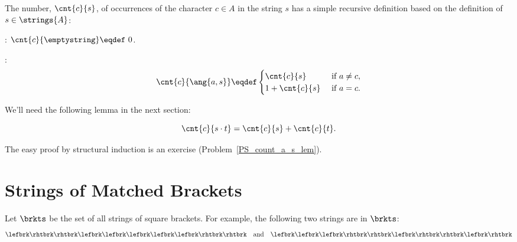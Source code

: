 The number, $\cnt{c}{s}$, of occurrences of the character $c \in A$ in
the string $s$ has a simple recursive definition based on the
definition of $s \in \strings{A}$:
\begin{definition}\label{countas_def} \mbox{}

: $\cnt{c}{\emptystring} \eqdef\ 0$.

:
\[
\cnt{c}{\ang{a,s}} \eqdef \begin{cases}
                           \cnt{c}{s}  &\text{ if } a \neq c,\\
                           1 + \cnt{c}{s} &\text{ if } a = c.
                           \end{cases}
\]

\end{definition}

We'll need the following lemma in the next section:
\begin{lemma}\label{countas_lem}
\[
\cnt{c}{s \cdot t} = \cnt{c}{s} + \cnt{c}{t}.
\]
\end{lemma}
The easy proof by structural induction is an exercise
(Problem~\ref{PS_count_a_s_lem}).

\begin{problems}
\classproblems
{}

\homeworkproblems
{}

\examproblems
{}

\end{problems}

\section{Strings of Matched Brackets}

Let $\brkts$ be the set of all strings of square brackets.  For example,
the following two strings are in $\brkts$:
\begin{equation}\label{2strings}
\lefbrk\rhtbrk\rhtbrk\lefbrk\lefbrk\lefbrk\lefbrk\lefbrk\rhtbrk\rhtbrk\quad \text{and}\quad \lefbrk\lefbrk\lefbrk\rhtbrk\rhtbrk\lefbrk\rhtbrk\rhtbrk\lefbrk\rhtbrk
\end{equation}

